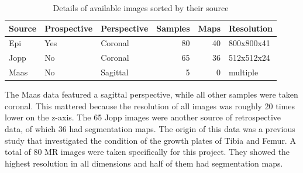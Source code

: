 \begin{table}[h!]
\centering
\begin{tabular}{l l l r r l}
    Source & Prospective & Perspective & Samples & Maps & Resolution \\
    \hline
    Epi    & Yes         & Coronal     & 80      & 40   & 800x800x41 \\
    Jopp   & No          & Coronal     & 65      & 36   & 512x512x24 \\
    Maas   & No          & Sagittal    & 5       & 0    & multiple \\
\end{tabular}
\caption{Details of available images sorted by their source}
\end{table}

The Maas data featured a sagittal perspective, while all other samples were taken coronal. This mattered because the resolution of all images was roughly 20 times lower on the z-axis. The 65 Jopp images were another source of retrospective data, of which 36 had segmentation maps. The origin of this data was a previous study that investigated the condition of the growth plates of Tibia and Femur. A total of 80 MR images were taken specifically for this project. They showed the highest resolution in all dimensions and half of them had segmentation maps.

